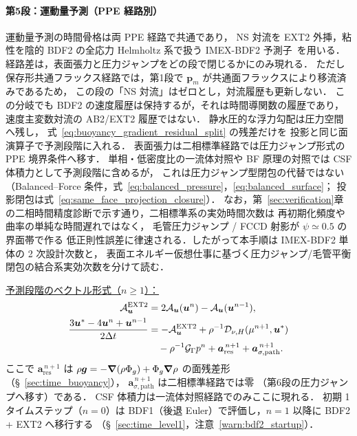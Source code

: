 \paragraph{第5段：運動量予測（PPE 経路別）}
運動量予測の時間骨格は両 PPE 経路で共通であり，
NS 対流を EXT2 外挿，粘性を陰的 BDF2 の全応力 Helmholtz 系で扱う
IMEX-BDF2 予測子~\cite{AscherRuuthSpiteri1997,AscherRuuthWetton1995,HairerWanner1996}を用いる．
経路差は，表面張力と圧力ジャンプをどの段で閉じるかにのみ現れる．
ただし保存形共通フラックス経路では，第1段で
$\bm{p}_m$ が共通面フラックスにより移流済みであるため，
この段の「NS 対流」はゼロとし，対流履歴も更新しない．
この分岐でも BDF2 の速度履歴は保持するが，それは時間導関数の履歴であり，
速度主変数対流の AB2/EXT2 履歴ではない．
静水圧的な浮力勾配は圧力空間へ残し，
式~\eqref{eq:buoyancy_gradient_residual_split} の残差だけを
投影と同じ面演算子で予測段階に入れる．
表面張力は二相標準経路では圧力ジャンプ形式の PPE 境界条件へ移す．
単相・低密度比の一流体対照や BF 原理の対照では CSF 体積力として予測段階に含めるが，
これは圧力ジャンプ型閉包の代替ではない
（Balanced--Force 条件，式~\eqref{eq:balanced_pressure}，\eqref{eq:balanced_surface}；
投影閉包は式~\eqref{eq:same_face_projection_closure}）．
なお，第~\ref{sec:verification}章の二相時間精度診断で示す通り，二相標準系の実効時間次数は
再初期化頻度や曲率の単純な時間遅れではなく，
毛管圧力ジャンプ / FCCD 射影が $\psi\simeq0.5$ の界面帯で作る
低正則性誤差に律速される．したがって本手順は IMEX-BDF2 単体の 2 次設計次数と，
表面エネルギー仮想仕事に基づく圧力ジャンプ/毛管平衡閉包の結合系実効次数を分けて読む．

\medskip
\underline{予測段階のベクトル形式（$n \ge 1$）：}
\begin{align*}
  \mathcal{A}_{\bm{u}}^{\mathrm{EXT2}}
    &= 2\mathcal{A}_{\bm{u}}(\bm{u}^n)
       - \mathcal{A}_{\bm{u}}(\bm{u}^{n-1}), \\
  \frac{3\bm{u}^* - 4\bm{u}^n + \bm{u}^{n-1}}{2\Delta t}
    &= -\mathcal{A}_{\bm{u}}^{\mathrm{EXT2}}
       + \rho^{-1}\mathcal{D}_{\nu,H}(\mu^{n+1},\bm{u}^*) \\
    &\quad - \rho^{-1}\mathcal{G}_{\Gamma}p^n
       + \bm{a}^{\,n+1}_{\mathrm{res}}
       + \bm{a}^{\,n+1}_{\sigma,\mathrm{path}} .
\end{align*}
ここで $\bm{a}^{\,n+1}_{\mathrm{res}}$ は
$\rho\bm{g}=-\bm{\nabla}(\rho\Phi_g)+\Phi_g\bm{\nabla}\rho$ の面残差形
（§~\ref{sec:time_buoyancy}），
$\bm{a}^{\,n+1}_{\sigma,\mathrm{path}}$ は二相標準経路では零
（第6段の圧力ジャンプへ移す）である．
CSF 体積力は一流体対照経路でのみここに現れる．
初期 1 タイムステップ（$n=0$）は BDF1（後退 Euler）で評価し，$n=1$ 以降に BDF2 + EXT2 へ移行する
（§~\ref{sec:time_level1}，注意~\ref{warn:bdf2_startup}）．


